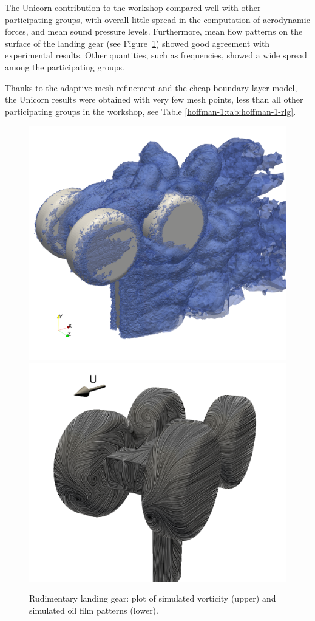 The Unicorn contribution to the workshop compared well with other
participating groups, with overall little spread in the computation
of aerodynamic forces, and mean sound pressure levels. Furthermore, mean flow
patterns on the surface of the landing gear (see Figure~\ref{hoffman-1:rlg})
showed good agreement with experimental results. Other quantities, such
as frequencies, showed a wide spread among the participating groups.

Thanks to the adaptive mesh refinement and the cheap boundary layer
model, the Unicorn results were obtained with very few mesh points,
less than all other participating groups in the workshop, see Table
\ref{hoffman-1:tab:hoffman-1-rlg}.

\begin{figure}
\bwfig
  \centering
  \includegraphics[width=\twofigs]{chapters/hoffman-1/png/rlg_vorticity}
  \includegraphics[width=\twofigs]{chapters/hoffman-1/png/oilfilm_back_sim}
  \caption{Rudimentary landing gear: plot of simulated vorticity (upper)
    and simulated oil film patterns (lower).}
  \label{hoffman-1:rlg}
\end{figure}

